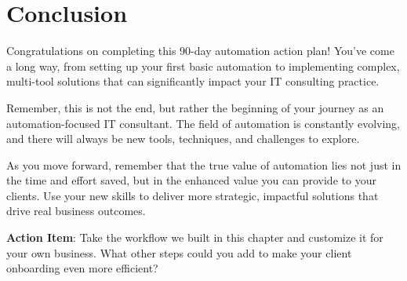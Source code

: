 \section{Conclusion}

Congratulations on completing this 90-day automation action plan! You've come a long way, from setting up your first basic automation to implementing complex, multi-tool solutions that can significantly impact your IT consulting practice.

Remember, this is not the end, but rather the beginning of your journey as an automation-focused IT consultant. The field of automation is constantly evolving, and there will always be new tools, techniques, and challenges to explore.

As you move forward, remember that the true value of automation lies not just in the time and effort saved, but in the enhanced value you can provide to your clients. Use your new skills to deliver more strategic, impactful solutions that drive real business outcomes.

\textbf{Action Item}: Take the workflow we built in this chapter and customize it for your own business. What other steps could you add to make your client onboarding even more efficient?

